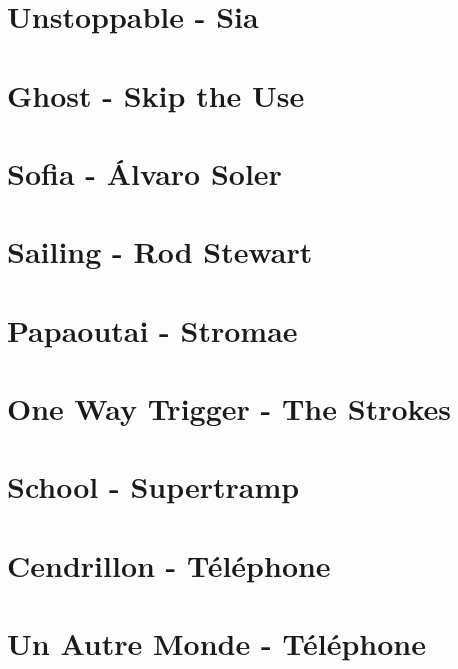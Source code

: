 \documentclass[11pt]{article}
\begin{document}
\section{Unstoppable - Sia}
\begin{guitar}

\end{guitar}

\section{Ghost - Skip the Use}


\section{Sofia - Álvaro Soler}
\begin{guitar}

\end{guitar}

\section{Sailing - Rod Stewart}


\section{Papaoutai - Stromae}


\section{One Way Trigger - The Strokes}


\section{School - Supertramp}



\section{Cendrillon - Téléphone}
\begin{guitar}

\end{guitar}

\section*{Un Autre Monde - Téléphone}
\end{document}
